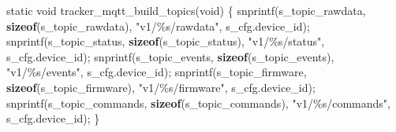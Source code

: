 \documentclass[a4paper]{extarticle}
\newenvironment{Shaded}{}{}
\newcommand{\DataTypeTok}[1]{\textcolor[rgb]{0.56,0.13,0.00}{#1}}
\newcommand{\KeywordTok}[1]{\textcolor[rgb]{0.00,0.44,0.13}{\textbf{#1}}}
\newcommand{\NormalTok}[1]{#1}
\newcommand{\OperatorTok}[1]{\textcolor[rgb]{0.40,0.40,0.40}{#1}}
\newcommand{\SpecialCharTok}[1]{\textcolor[rgb]{0.25,0.44,0.63}{#1}}
\newcommand{\StringTok}[1]{\textcolor[rgb]{0.25,0.44,0.63}{#1}}
\begin{document}
\begin{Shaded}
\begin{Highlighting}[]
\DataTypeTok{static} \DataTypeTok{void}\NormalTok{ tracker\_mqtt\_build\_topics}\OperatorTok{(}\DataTypeTok{void}\OperatorTok{)} \OperatorTok{\{}
\NormalTok{    snprintf}\OperatorTok{(}\NormalTok{s\_topic\_rawdata}\OperatorTok{,} \KeywordTok{sizeof}\OperatorTok{(}\NormalTok{s\_topic\_rawdata}\OperatorTok{),} \StringTok{"v1/}\SpecialCharTok{\%s}\StringTok{/rawdata"}\OperatorTok{,}\NormalTok{ s\_cfg}\OperatorTok{.}\NormalTok{device\_id}\OperatorTok{);}
\NormalTok{    snprintf}\OperatorTok{(}\NormalTok{s\_topic\_status}\OperatorTok{,} \KeywordTok{sizeof}\OperatorTok{(}\NormalTok{s\_topic\_status}\OperatorTok{),} \StringTok{"v1/}\SpecialCharTok{\%s}\StringTok{/status"}\OperatorTok{,}\NormalTok{ s\_cfg}\OperatorTok{.}\NormalTok{device\_id}\OperatorTok{);}
\NormalTok{    snprintf}\OperatorTok{(}\NormalTok{s\_topic\_events}\OperatorTok{,} \KeywordTok{sizeof}\OperatorTok{(}\NormalTok{s\_topic\_events}\OperatorTok{),} \StringTok{"v1/}\SpecialCharTok{\%s}\StringTok{/events"}\OperatorTok{,}\NormalTok{ s\_cfg}\OperatorTok{.}\NormalTok{device\_id}\OperatorTok{);}
\NormalTok{    snprintf}\OperatorTok{(}\NormalTok{s\_topic\_firmware}\OperatorTok{,} \KeywordTok{sizeof}\OperatorTok{(}\NormalTok{s\_topic\_firmware}\OperatorTok{),} \StringTok{"v1/}\SpecialCharTok{\%s}\StringTok{/firmware"}\OperatorTok{,}\NormalTok{ s\_cfg}\OperatorTok{.}\NormalTok{device\_id}\OperatorTok{);}
\NormalTok{    snprintf}\OperatorTok{(}\NormalTok{s\_topic\_commands}\OperatorTok{,} \KeywordTok{sizeof}\OperatorTok{(}\NormalTok{s\_topic\_commands}\OperatorTok{),} \StringTok{"v1/}\SpecialCharTok{\%s}\StringTok{/commands"}\OperatorTok{,}\NormalTok{ s\_cfg}\OperatorTok{.}\NormalTok{device\_id}\OperatorTok{);}
\OperatorTok{\}}


\end{Highlighting}
\end{Shaded}
\end{document}
